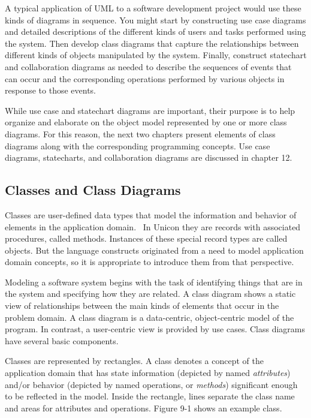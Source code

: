 A typical application of UML to a software development project would use
these kinds of diagrams in sequence. You might start by constructing
use case diagrams and detailed descriptions of the different kinds of
users and tasks performed using the system. Then develop class diagrams
that capture the relationships between different kinds of objects
manipulated by the system. Finally, construct statechart and
collaboration diagrams as needed to describe the sequences of events
that can occur and the corresponding operations performed by various
objects in response to those events.

While use case and statechart diagrams are important, their purpose is
to help organize and elaborate on the object model represented by one
or more class diagrams. For this reason, the next two chapters present
elements of class diagrams along with the corresponding programming
concepts. Use case diagrams, statecharts, and collaboration diagrams
are discussed in chapter 12.

\subsection{Classes and Class Diagrams}

Classes are user-defined data types that model the information and
behavior of elements in the application domain. \ In Unicon they are
records with associated procedures, called methods. Instances of these
special record types are called objects.  But the language constructs
originated from a need to model application domain concepts, so it is
appropriate to introduce them from that perspective.

Modeling a software system begins with the task of identifying things
that are in the system and specifying how they are related. A class
diagram shows a static view of relationships between the main kinds of
elements that occur in the problem domain. A class diagram is a
data-centric, object-centric model of the program. In contrast, a
user-centric view is provided by use cases. Class
diagrams have several basic components.

Classes are represented by rectangles. A
{\textquotedbl}class{\textquotedbl} denotes a concept of the
application domain that has state information (depicted by named
\textit{attributes}) and/or behavior (depicted
by named operations, or \textit{methods}) significant
enough to be reflected in the model. Inside the rectangle, lines
separate the class name and areas for attributes and operations. Figure
9-1 shows an example class.

